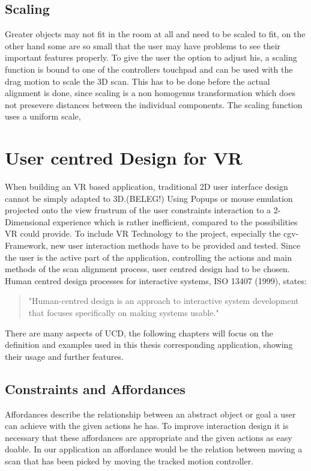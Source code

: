 \documentclass[hyperref,english,bachelorofscience,bibnum]{cgvpub}
\begin{document}
\subsection{Scaling}

Greater objects may not fit in the room at all and need to be scaled to fit, on the other hand some are so small that the user may have problems to see their important features properly. To give the user the option to adjust his, a scaling function is bound to one of the controllers touchpad and can be used with the drag motion to scale the 3D scan. This has to be done before the actual alignment is done, since scaling is a non homogenus transformation which does not presevere distances between the individual components. The scaling function uses a uniform scale,%

\section{User centred Design for VR}

When building an VR based application, traditional 2D user interface design cannot be simply adapted to 3D.(BELEG!)
Using Popups or mouse emulation projected onto the view frustrum of the user constraints interaction to a 2-Dimensional experience which is rather inefficient, compared to the possibilities VR could provide.
To include VR Technology to the project, especially the cgv-Framework, new user interaction methods have to be provided and tested. Since the user is the active part of the application, controlling the actions and main methods of the scan alignment process, user centred design had to be chosen. 
Human centred design processes for interactive systems, ISO 13407 (1999), states: 
\begin{quote}
"Human-centred design is an approach to interactive system development that focuses specifically on making systems usable."
\end{quote}
There are many aspects of UCD, the following chapters will focus on the definition and examples used in this thesis corresponding application, showing their usage and further features.

\subsection{Constraints and Affordances}

Affordances describe the relationship between an abstract object or goal a user can achieve with the given actions he has\cite{Jerald2015}.
To improve interaction design it is necessary that these affordances are appropriate and the given actions as easy doable\cite{Jerald2015}.
In our application an affordance would be the relation between moving a scan that has been picked by moving the tracked motion controller. 
\end{document}
